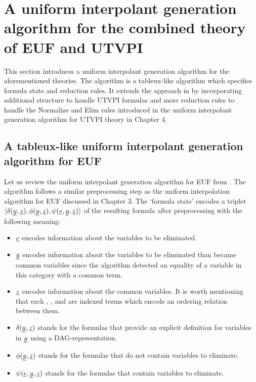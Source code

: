 \section{A uniform interpolant generation algorithm for the 
combined theory of EUF and UTVPI}

This section introduces a uniform interpolant
generation algorithm for the aforementioned theories.
The algorithm is a tableux-like algorithm which specifies
formula state and reduction rules.
It extends the approach in \cite{ghilardi2020compactly}
by incorporating additional structure to handle 
UTVPI formulas and more reduction rules to handle
the Normalize and Elim rules introduced in the
uniform interpolant generation algorithm for
UTVPI theory in Chapter 4. 

\subsection{A tableux-like uniform interpolant 
  generation algorithm for EUF}

Let us review the uniform interpolant generation algorithm
for EUF from \cite{ghilardi2020compactly}. The algorithm follows a
similar preprocessing step as the uniform interpolation algorithm for EUF 
discussed in Chapter 3. The `formula state'
encodes a triplet $\langle \delta(\underline{y}, \underline{z}), 
\phi(\underline{y}, \underline{z}), \psi(\underline{e}, \underline{y}, \underline{z})
\rangle$ of the resulting formula after preprocessing 
with the following meaning:

\begin{itemize}
  \item $\underline{e}$ encodes information about the variables to be eliminated.
  \item $\underline{y}$ encodes information about the variables to be eliminated
    than became common variables since the algorithm detected an equality
    of a variable in this category with a common term.
  \item $\underline{z}$ encodes information about the common variables. It is worth
    mentioning that each , , and  are indexed terms
    which encode an ordering relation between them.
  \item $\delta(\underline{y}, \underline{z})$ stands for the formulas that provide
    an explicit definition for variables in $\underline{y}$ using a DAG-representation.
  \item $\phi(\underline{y}, \underline{z})$ stands for the formulas that do not contain
    variables to eliminate.
  \item $\psi(\underline{e}, \underline{y}, \underline{z})$ stands for the formulas
    that contain variables to eliminate.
\end{itemize}

